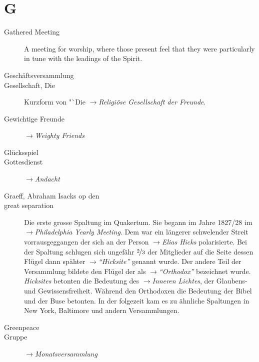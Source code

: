 \section*{G}

\articlesize

\begin{description}

\item[Gathered Meeting]
    A meeting for worship, where those present feel that they were particularly in tune with the leadings of the Spirit.

 \item[Geschäftsversammlung]

 \item[Gesellschaft, Die] Kurzform von "`Die $\to$\textit{Religiöse Gesellschaft der Freunde}.

\item[Gewichtige Freunde] $\to$\textit{Weighty Friends}

\item[Glücksspiel]

\item[Gottesdienst] $\to$\textit{Andacht}

 \item[Graeff, Abraham Isacks op den]

 \item[great separation] Die erste grosse Spaltung im Quakertum. Sie begann im
 Jahre 1827/28 im $\to$\textit{Philadelphia Yearly Meeting}. Dem war ein
 längerer schwelender Streit vorrausgeggangen der sich an der Person
 $\to$\textit{Elias Hicks} polarisierte. Bei der Spaltung schlugen sich
 ungefähr $\nicefrac{2}{3}$ der Mitglieder auf die Seite dessen Flügel dann
 spähter $\to$\textit{"`Hicksite"'} genannt wurde. Der andere Teil der
 Versammlung bildete den Flügel der als $\to$\textit{"`Orthodox"'} bezeichnet
 wurde. \textit{Hicksites} betonten die Bedeutung des $\to$\textit{Inneren
 Lichtes}, der Glaubens- und Gewissensfreiheit. Während den Orthodoxen die
 Bedeutung der Bibel und der Buse betonten. In der folgezeit kam es zu
 ähnliche Spaltungen in New York, Baltimore und andern Versammlungen.

 \item[Greenpeace]

\item[Gruppe] $\to$\textit{Monatsversammlung}


\end{description}
